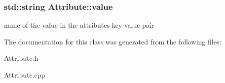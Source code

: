 \subsubsection[{value}]{\setlength{\rightskip}{0pt plus 5cm}std\+::string Attribute\+::value\hspace{0.3cm}{\ttfamily [private]}}\label{class_attribute_a4f4440de5f75e37d71d2d460477a16cb}
name of the \textquotesingle{}value\textquotesingle{} in the attribute\textquotesingle{}s key-\/value pair 

The documentation for this class was generated from the following files\+:\begin{DoxyCompactItemize}
\item 
Attribute.\+h\item 
Attribute.\+cpp\end{DoxyCompactItemize}

